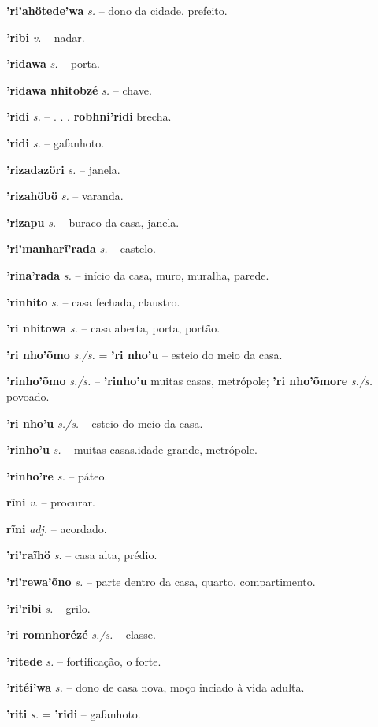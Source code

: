 \textbf{'ri'ahötede'wa} \textit{s.} -- dono da cidade, prefeito.

\textbf{'ribi} \textit{v.} -- nadar.

\textbf{'ridawa} \textit{s.} -- porta.

\textbf{'ridawa nhitobzé} \textit{s.} -- chave.

\textbf{'ridi} \textit{s.} -- . . . \textbf{robhni'ridi} brecha.

\textbf{'ridi} \textit{s.} -- gafanhoto.

\textbf{'rizadazöri} \textit{s.} -- janela.

\textbf{'rizahöbö} \textit{s.} -- varanda.

\textbf{'rizapu} \textit{s.} -- buraco da casa, janela.

\textbf{'ri'manharĩ'rada} \textit{s.} -- castelo.

\textbf{'rina'rada} \textit{s.} -- início da casa, muro, muralha, parede.

\textbf{'rinhito} \textit{s.} -- casa fechada, claustro.

\textbf{'ri nhitowa} \textit{s.} -- casa aberta, porta, portão.

\textbf{'ri nho'õmo} \textit{s./s.} = \textbf{'ri nho'u} -- esteio do meio da casa.

\textbf{'rinho'õmo} \textit{s./s.} -- \textbf{'rinho'u} muitas casas, metrópole; \textbf{'ri nho'õmore} \textit{s./s.} povoado.

\textbf{'ri nho'u} \textit{s./s.} -- esteio do meio da casa.

\textbf{'rinho'u} \textit{s.} -- muitas casas.idade grande, metrópole.

\textbf{'rinho're} \textit{s.} -- páteo.

\textbf{rĩni} \textit{v.} -- procurar.

\textbf{rĩni} \textit{adj.} -- acordado.

\textbf{'ri'raĩhö} \textit{s.} -- casa alta, prédio.

\textbf{'ri'rewa'õno} \textit{s.} -- parte dentro da casa, quarto, compartimento.

\textbf{'ri'ribi} \textit{s.} -- grilo.

\textbf{'ri romnhorézé} \textit{s./s.} -- classe.

\textbf{'ritede} \textit{s.} -- fortificação, o forte.

\textbf{'ritéi'wa} \textit{s.} -- dono de casa nova, moço inciado à vida adulta.

\textbf{'riti} \textit{s.} = \textbf{'ridi} -- gafanhoto.

